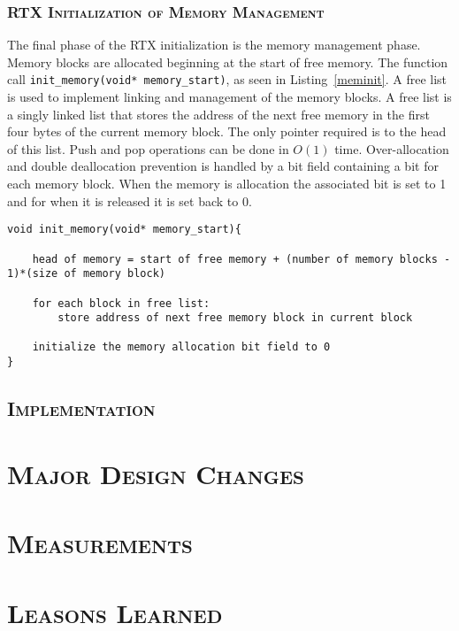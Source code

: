 \documentclass[oneside]{report}
\begin{document}
\subsection{\textsc{RTX Initialization of Memory Management}}
\label{sec:mem_management}
The final phase of the RTX initialization is the memory management phase.
Memory blocks are allocated beginning at the start of free memory. The function
call \texttt{init\_memory(void* memory\_start)}, as seen in
Listing~\ref{meminit}. A free list is used to implement linking and management
of the memory blocks. A free list is a singly linked list that stores the
address of the next free memory in the first four bytes of the current memory
block. The only pointer required is to the head of this list. Push and pop
operations can be done in $O(1)$ time. Over-allocation and double deallocation
prevention is handled by a bit field containing a bit for each memory block.
When the memory is allocation the associated bit is set to 1 and for when it is
released it is set back to 0.

\begin{lstlisting}
void init_memory(void* memory_start){
    
    head of memory = start of free memory + (number of memory blocks - 1)*(size of memory block)
    
    for each block in free list:
        store address of next free memory block in current block

    initialize the memory allocation bit field to 0
}
\end{lstlisting}


\section{\textsc{Implementation}}

\chapter{\textsc{Major Design Changes}}

\chapter{\textsc{Measurements}}

\chapter{\textsc{Leasons Learned}}
\end{document}
